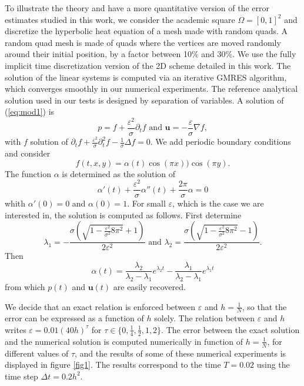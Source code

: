 \documentclass[a4paper,french,english,10pt]{article}
\newcommand\eps{\varepsilon}
\begin{document}
To illustrate the theory and have a more quantitative version of the error estimates
studied in this work, we consider the academic square $\Omega=[0,1]^2$ and discretize the hyperbolic heat equation
of a mesh made with random quads. 
A random quad mesh is made of quads where the vertices are moved
randomly around their initial position, by a factor between 10\% and 30\%.
We use the fully implicit time discretization version of the 2D scheme
detailed in this work. The solution of the linear systems is computed via
an iterative GMRES algorithm, which converges smoothly in our numerical experiments.
The reference analytical solution used in our tests is designed by separation of variables.
A solution of (\ref{eq:mod1}) is
$$
p= f+\frac{\eps^2}\sigma \partial_t f
\mbox{ and }
\mathbf u= -\frac\eps \sigma \nabla f,
$$
with $f$ solution of 
$
\partial_t f +\frac{\eps^2}\sigma \partial_t^2 f -\frac1\sigma \Delta f=0$.
We add periodic boundary conditions and consider
$$
f(t,x,y)=\alpha(t)\cos (\pi x ))\cos( \pi y ).
$$
The function $\alpha$ is determined as the solution of
$$
\alpha'(t)+ \frac{\eps^2}\sigma\alpha''(t)+\frac{2\pi}\sigma \alpha=0
$$
whith $\alpha'(0)=0$ and $\alpha(0)=1$.
For small $\eps$, which is the case we are interested in, the solution is computed as follows.
First determine 
$$
\lambda_1=-
\frac{
\sigma \left( \sqrt{1-\frac{\eps^2}{\sigma^2}  8 \pi^2  } +1\right)
}{2 \eps^2  }
\mbox{ and }
\lambda_2=
\frac{
\sigma \left( \sqrt{1-\frac{\eps^2}{\sigma^2}  8 \pi^2  } -1\right)
}{2 \eps^2  }.
$$
Then 
$$
\alpha(t)=\frac{\lambda_2}{\lambda_2-\lambda_1}e^{\lambda_2 t  }
-
\frac{\lambda_1}{\lambda_2-\lambda_1}e^{\lambda_1 t  }
$$
from which $p(t)$ and $\mathbf u(t)$ are easily recovered.

We decide that an exact relation is enforced between
$\eps$ and $h=\frac1N$, so that the error can be expressed as a function of $h$ solely.
The relation between $\eps$ and $h$ writes
$\eps=0.01 (40h)^\tau$ for $\tau \in\{0,\frac14, \frac12, 1, 2  \}$.
The error between the exact solution and the numerical solution is computed numerically
in function of $h=\frac1N$, for different values of $\tau$, and the results of some of these numerical experiments is
displayed in figure \ref{fig1}. The results correspond  to the  time $T = 0.02$ using the time step 
$\Delta t = 0.2 h^2$.
\end{document}
